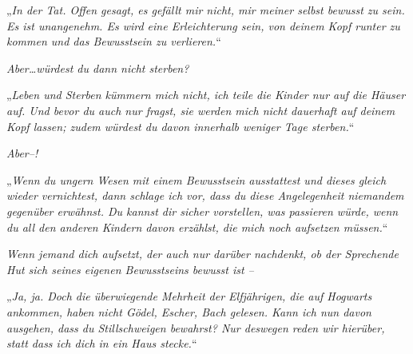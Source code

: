 
„\emph{In der Tat. Offen gesagt, es gefällt mir nicht, mir meiner selbst bewusst zu sein. Es ist unangenehm. Es wird eine Erleichterung sein, von deinem Kopf runter zu kommen und das Bewusstsein zu verlieren.}“

\emph{Aber…würdest du dann nicht sterben?}

„\emph{Leben und Sterben kümmern mich nicht, ich teile die Kinder nur auf die Häuser auf. Und bevor du auch nur fragst, sie werden mich nicht dauerhaft auf deinem Kopf lassen; zudem würdest du davon innerhalb weniger Tage sterben.}“

\emph{Aber–!}

„\emph{Wenn du ungern Wesen mit einem Bewusstsein ausstattest und dieses gleich wieder vernichtest, dann schlage ich vor, dass du diese Angelegenheit niemandem gegenüber erwähnst. Du kannst dir sicher vorstellen, was passieren würde, wenn du all den anderen Kindern davon erzählst, die mich noch aufsetzen müssen.}“

\emph{Wenn jemand dich aufsetzt, der auch nur darüber \emph{nachdenkt}, ob der Sprechende Hut sich seines eigenen Bewusstseins bewusst ist –}

„\emph{Ja, ja. Doch die überwiegende Mehrheit der Elfjährigen, die auf Hogwarts ankommen, haben nicht \emph{Gödel, Escher, Bach} gelesen. Kann ich nun davon ausgehen, dass du Stillschweigen bewahrst? Nur \emph{deswegen} reden wir hierüber, statt dass ich dich in ein Haus stecke.}“

